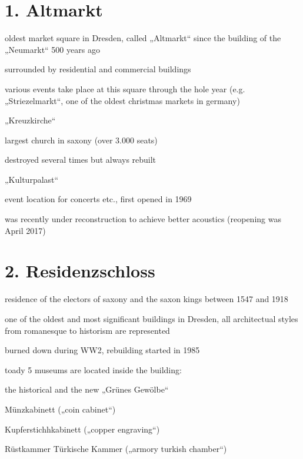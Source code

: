 \documentclass[a4paper,12pt]{report}
\begin{document}
\section{1. Altmarkt}
\begin{itemize*}
\item oldest market square in Dresden, called „Altmarkt“ since the building of the „Neumarkt“ 500 years ago
\item surrounded by residential and commercial buildings
\item various events take place at this square through the hole year (e.g. „Striezelmarkt“, one of the oldest christmas markets in germany)
\item „Kreuzkirche“
    \begin{itemize*}
    \item largest church in saxony (over 3.000 seats)
    \item destroyed several times but always rebuilt
    \end{itemize*}
\item „Kulturpalast“
    \begin{itemize*}
    \item event location for concerts etc., first opened in 1969
    \item was recently under reconstruction to achieve better acoustics (reopening was April 2017)
    \end{itemize*}
\end{itemize*}

\section{2. Residenzschloss}
\begin{itemize*}
\item residence of the electors of saxony and the saxon kings between 1547 and 1918
\item one of the oldest and most significant buildings in Dresden, all architectual styles from romanesque to historism are represented
\item burned down during WW2, rebuilding started in 1985
\item toady 5 museums are located inside the building:
    \begin{itemize*}
    \item the historical and the new „Grünes Gewölbe“
    \item Münzkabinett („coin cabinet“)
    \item Kupferstichhkabinett („copper engraving“)
    \item Rüstkammer Türkische Kammer („armory turkish chamber“)
    \end{itemize*}
\end{itemize*}
\end{document}
